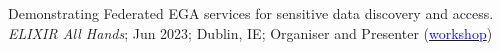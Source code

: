 \documentclass[margin,line]{res}
\begin{document}
\begin{resume}
Demonstrating Federated EGA services for sensitive data discovery and access. {\em ELIXIR All Hands}; Jun 2023; Dublin, IE; Organiser and Presenter (\href{https://f1000research.com/slides/12-638}{\textcolor{blue}{workshop}})













\end{resume}
\end{document}
